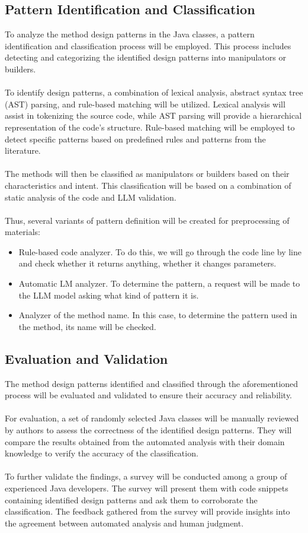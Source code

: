 \documentclass[draft]{article}
\begin{document}
\subsection{Pattern Identification and Classification}
To analyze the method design patterns in the Java classes, a pattern identification and classification process will be employed. This process includes detecting and categorizing the identified design patterns into manipulators or builders.\\
~\\
To identify design patterns, a combination of lexical analysis, abstract syntax tree (AST) parsing, and rule-based matching will be utilized. Lexical analysis will assist in tokenizing the source code, while AST parsing will provide a hierarchical representation of the code's structure. Rule-based matching will be employed to detect specific patterns based on predefined rules and patterns from the literature.\\
~\\
The methods will then be classified as manipulators or builders based on their characteristics and intent. This classification will be based on a combination of static analysis of the code and LLM validation.\\
~\\
Thus, several variants of pattern definition will be created for preprocessing of materials:
\begin{itemize}
  \item Rule-based code analyzer. To do this, we will go through the code line by line and check whether it returns anything, whether it changes parameters.
  \item Automatic LM analyzer. To determine the pattern, a request will be made to the LLM model asking what kind of pattern it is.
  \item Analyzer of the method name. In this case, to determine the pattern used in the method, its name will be checked.
\end{itemize}
\subsection{Evaluation and Validation}
The method design patterns identified and classified through the aforementioned process will be evaluated and validated to ensure their accuracy and reliability.\\
~\\
For evaluation, a set of randomly selected Java classes will be manually reviewed by authors to assess the correctness of the identified design patterns. They will compare the results obtained from the automated analysis with their domain knowledge to verify the accuracy of the classification.\\
~\\
To further validate the findings, a survey will be conducted among a group of experienced Java developers. The survey will present them with code snippets containing identified design patterns and ask them to corroborate the classification. The feedback gathered from the survey will provide insights into the agreement between automated analysis and human judgment.
\end{document}
